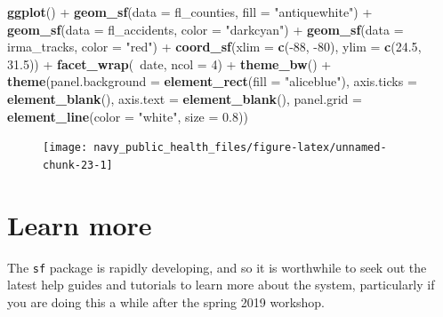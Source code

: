 \documentclass[]{tufte-book}
\newenvironment{Shaded}{}{}
\newcommand{\DataTypeTok}[1]{\textcolor[rgb]{0.56,0.13,0.00}{#1}}
\newcommand{\DecValTok}[1]{\textcolor[rgb]{0.25,0.63,0.44}{#1}}
\newcommand{\FloatTok}[1]{\textcolor[rgb]{0.25,0.63,0.44}{#1}}
\newcommand{\KeywordTok}[1]{\textcolor[rgb]{0.00,0.44,0.13}{\textbf{#1}}}
\newcommand{\NormalTok}[1]{#1}
\newcommand{\OperatorTok}[1]{\textcolor[rgb]{0.40,0.40,0.40}{#1}}
\newcommand{\StringTok}[1]{\textcolor[rgb]{0.25,0.44,0.63}{#1}}
\begin{document}
\begin{Shaded}
\begin{Highlighting}[]
\KeywordTok{ggplot}\NormalTok{() }\OperatorTok{+}\StringTok{ }\KeywordTok{geom_sf}\NormalTok{(}\DataTypeTok{data =}\NormalTok{ fl_counties, }\DataTypeTok{fill =} \StringTok{"antiquewhite"}\NormalTok{) }\OperatorTok{+}\StringTok{ }
\StringTok{    }\KeywordTok{geom_sf}\NormalTok{(}\DataTypeTok{data =}\NormalTok{ fl_accidents, }\DataTypeTok{color =} \StringTok{"darkcyan"}\NormalTok{) }\OperatorTok{+}\StringTok{ }
\StringTok{    }\KeywordTok{geom_sf}\NormalTok{(}\DataTypeTok{data =}\NormalTok{ irma_tracks, }\DataTypeTok{color =} \StringTok{"red"}\NormalTok{) }\OperatorTok{+}\StringTok{ }
\StringTok{    }\KeywordTok{coord_sf}\NormalTok{(}\DataTypeTok{xlim =} \KeywordTok{c}\NormalTok{(}\OperatorTok{-}\DecValTok{88}\NormalTok{, }\DecValTok{-80}\NormalTok{), }\DataTypeTok{ylim =} \KeywordTok{c}\NormalTok{(}\FloatTok{24.5}\NormalTok{, }
        \FloatTok{31.5}\NormalTok{)) }\OperatorTok{+}\StringTok{ }\KeywordTok{facet_wrap}\NormalTok{(}\OperatorTok{~}\NormalTok{date, }\DataTypeTok{ncol =} \DecValTok{4}\NormalTok{) }\OperatorTok{+}\StringTok{ }
\StringTok{    }\KeywordTok{theme_bw}\NormalTok{() }\OperatorTok{+}\StringTok{ }\KeywordTok{theme}\NormalTok{(}\DataTypeTok{panel.background =} \KeywordTok{element_rect}\NormalTok{(}\DataTypeTok{fill =} \StringTok{"aliceblue"}\NormalTok{), }
    \DataTypeTok{axis.ticks =} \KeywordTok{element_blank}\NormalTok{(), }\DataTypeTok{axis.text =} \KeywordTok{element_blank}\NormalTok{(), }
    \DataTypeTok{panel.grid =} \KeywordTok{element_line}\NormalTok{(}\DataTypeTok{color =} \StringTok{"white"}\NormalTok{, }
        \DataTypeTok{size =} \FloatTok{0.8}\NormalTok{))}
\end{Highlighting}
\end{Shaded}

\begin{figure}
\texttt{[image: navy\_public\_health\_files/figure-latex/unnamed-chunk-23-1]} \end{figure}

\hypertarget{learn-more-1}{%
\section{Learn more}\label{learn-more-1}}

The \texttt{sf} package is rapidly developing, and so it is worthwhile to seek out the latest
help guides and tutorials to learn more about the system, particularly if you are doing
this a while after the spring 2019 workshop.
\end{document}
